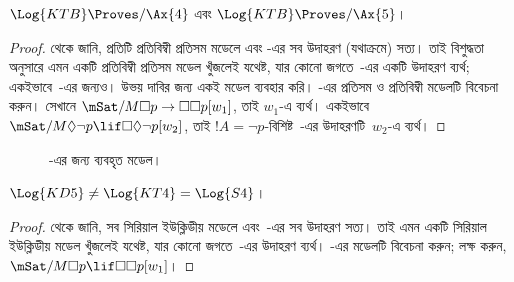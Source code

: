 \documentclass[../../../include/open-logic-section]{subfiles}
\begin{document}
\begin{thm}
  $\Log{KTB} \Proves/ \Ax{4}$ এবং $\Log{KTB} \Proves/ \Ax{5}$।
\end{thm}

\begin{proof}
   থেকে জানি, প্রতিটি প্রতিবিম্বী প্রতিসম মডেলে  এবং -এর সব উদাহরণ (যথাক্রমে) সত্য। তাই বিশুদ্ধতা অনুসারে এমন একটি প্রতিবিম্বী প্রতিসম মডেল খুঁজলেই যথেষ্ট, যার কোনো জগতে~-এর একটি উদাহরণ ব্যর্থ; একইভাবে~-এর জন্যও। উভয় দাবির জন্য একই মডেল ব্যবহার করি। -এর প্রতিসম ও প্রতিবিম্বী মডেলটি বিবেচনা করুন। সেখানে $\mSat/{M}{\Box p \to \Box \Box
    p}[w_1]$, তাই $w_1$-এ  ব্যর্থ। একইভাবে $\mSat/{M}{\Diamond
    \lnot p \lif \Box \Diamond \lnot p}[w_2]$, তাই $!A = \lnot p$-বিশিষ্ট~-এর উদাহরণটি~$w_2$-এ ব্যর্থ।
\end{proof}

\begin{figure}[htpb]
  \centering
  \caption{-এর জন্য ব্যবহৃত মডেল।}
\end{figure}

\begin{thm}
  $\Log{KD5} \neq \Log{KT4} = \Log{S4}$।
\end{thm}

\begin{proof}
   থেকে জানি, সব সিরিয়াল ইউক্লিডীয় মডেলে  এবং~-এর সব উদাহরণ সত্য। তাই এমন একটি সিরিয়াল ইউক্লিডীয় মডেল খুঁজলেই যথেষ্ট, যার কোনো জগতে~-এর উদাহরণ ব্যর্থ। -এর মডেলটি বিবেচনা করুন; লক্ষ করুন, $\mSat/{M}{\Box p
  \lif \Box\Box p}[w_1]$।
\end{proof}
\end{document}
